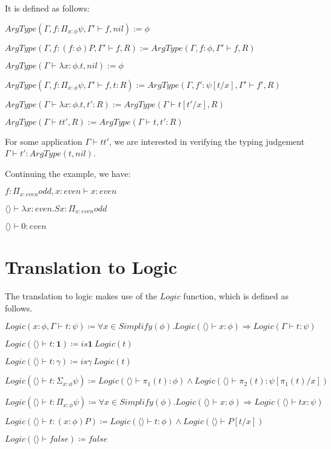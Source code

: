 \documentclass[12pt,a4paper,titlepage]{article}
\newcommand{\lnc}[1]{Logic(\langle \rangle \vdash #1)}
\begin{document}
    It is defined as follows:

    $ArgType(\Gamma, f: \Pi_{x: \phi} \psi, \Gamma' \vdash f, nil) := \phi$

    $ArgType(\Gamma, f: (f: \phi)P, \Gamma' \vdash f, R) := ArgType(\Gamma, f: \phi, \Gamma' \vdash f, R)$

    $ArgType(\Gamma \vdash \lambda x: \phi . t, nil) := \phi$

    $ArgType(\Gamma, f: \Pi_{x: \phi} \psi, \Gamma' \vdash f, t : R) := ArgType(\Gamma, f': \psi[t / x], \Gamma' \vdash f', R)$

    $ArgType(\Gamma \vdash \lambda x: \phi . t, t' : R) := ArgType(\Gamma \vdash t[t'/x], R)$

    $ArgType(\Gamma \vdash t t', R) := ArgType(\Gamma \vdash t, t' : R)$

    For some application $\Gamma \vdash t t'$, we are interested in verifying the typing judgement $\Gamma \vdash t': ArgType(t, nil)$.

    Continuing the example, we have:

    $f: \Pi_{x: even} odd, x: even \vdash x: even$

    $\langle \rangle \vdash \lambda x: even . S x: \Pi_{x: even} odd$

    $\langle \rangle \vdash 0: even$

    \section{Translation to Logic}

    The translation to logic makes use of the $Logic$ function, which is defined as follows.

    $Logic(x: \phi, \Gamma \vdash t: \psi) \coloneqq
    \forall x \in Simplify(\phi) . \lnc{x: \phi} \Rightarrow Logic(\Gamma \vdash t: \psi)$

    $\lnc{t: \textbf{1}} \coloneqq is\textbf{1}\ Logic(t)$

    $\lnc{t: \gamma} \coloneqq is\gamma\ Logic(t)$

    $\lnc{t: \Sigma_{x: \phi} \psi} \coloneqq \lnc{\pi_1 (t) : \phi} \land \lnc{\pi_2 (t): \psi[\pi_1 (t) / x]}$

    $\lnc{t: \Pi_{x: \phi} \psi} \coloneqq \forall x \in Simplify(\phi) . \lnc{x: \phi} \Rightarrow \lnc{tx: \psi}$

    $\lnc{t: (x: \phi)P} \coloneqq \lnc{t: \phi} \land \lnc{P[t/x]}$

    $\lnc{false} \coloneqq false$
\end{document}
